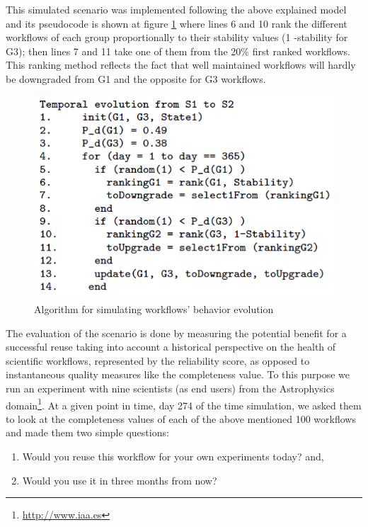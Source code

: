 This simulated scenario was implemented following the above explained
model and its pseudocode is shown at figure
\ref{BehaviourEvolutionAlgorithm} where lines 6 and 10 rank the
different workflows of each group proportionally to their stability
values (1 -stability for G3); then lines 7 and 11 take one of them from
the 20\% first ranked workflows. This ranking method reflects the fact
that well maintained workflows will hardly be downgraded from G1 and the
opposite for G3 workflows.

\begin{figure}[htbp]
\centering
\includegraphics{figures/BehaviourEvolutionAlgorithm.png}
\caption{Algorithm for simulating workflows' behavior evolution
\label{BehaviourEvolutionAlgorithm}}
\end{figure}

The evaluation of the scenario is done by measuring the potential
benefit for a successful reuse taking into account a historical
perspective on the health of scientific workflows, represented by the
reliability score, as opposed to instantaneous quality measures like the
completeness value. To this purpose we run an experiment with nine
scientists (as end users) from the Astrophysics domain\footnote{\url{http://www.iaa.es}}.
At a given point in time, day 274 of the time simulation, we asked them
to look at the completeness values of each of the above mentioned 100
workflows and made them two simple questions:

\begin{enumerate}
\def\labelenumi{\arabic{enumi}.}
\itemsep1pt\parskip0pt
\item
  Would you reuse this workflow for your own experiments today? and,
\item
  Would you use it in three months from now?
\end{enumerate}

